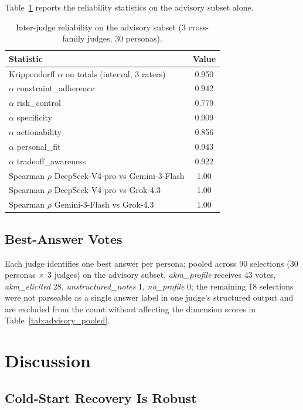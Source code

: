 \documentclass[11pt]{article}
\begin{document}
Table~\ref{tab:dae_agreement} reports the reliability statistics on the advisory subset alone.

\begin{table}[h]
\centering
\caption{Inter-judge reliability on the advisory subset (3 cross-family judges, 30 personas).}
\label{tab:dae_agreement}
\begin{tabular}{lc}
\toprule
Statistic & Value \\
\midrule
Krippendorff $\alpha$ on totals (interval, 3 raters) & 0.950 \\
$\alpha$ constraint\_adherence & 0.942 \\
$\alpha$ risk\_control         & 0.779 \\
$\alpha$ specificity           & 0.909 \\
$\alpha$ actionability         & 0.856 \\
$\alpha$ personal\_fit         & 0.943 \\
$\alpha$ tradeoff\_awareness   & 0.922 \\
Spearman $\rho$ DeepSeek-V4-pro vs Gemini-3-Flash & 1.00 \\
Spearman $\rho$ DeepSeek-V4-pro vs Grok-4.3       & 1.00 \\
Spearman $\rho$ Gemini-3-Flash  vs Grok-4.3       & 1.00 \\
\bottomrule
\end{tabular}
\end{table}

\subsection{Best-Answer Votes}

Each judge identifies one best answer per persona; pooled across 90 selections (30 personas $\times$ 3 judges) on the advisory subset, \textit{akm\_profile} receives 43 votes, \textit{akm\_elicited} 28, \textit{unstructured\_notes} 1, \textit{no\_profile} 0; the remaining 18 selections were not parseable as a single answer label in one judge's structured output and are excluded from the count without affecting the dimension scores in Table~\ref{tab:advisory_pooled}.

\section{Discussion}

\subsection{Cold-Start Recovery Is Robust}
\end{document}
